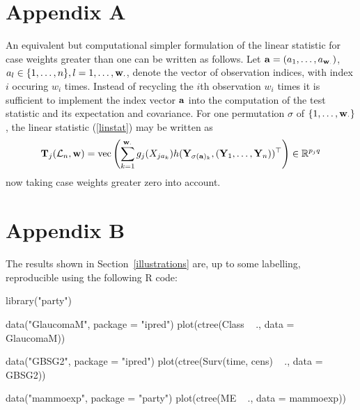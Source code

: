 
\section*{Appendix A}

An equivalent but computational simpler formulation of the linear statistic
for case weights greater than one can be written as follows. Let $\mathbf{a} = (a_1,
\dots, a_{\mathbf{w}_\cdot})$, $a_l \in \{1, \dots, n\}, l = 1, \dots, \mathbf{w}_\cdot$, denote the
vector of observation indices, with index $i$ occuring $w_i$ times. 
Instead of recycling the $i$th observation $w_i$ times it is sufficient to
implement the index vector $\mathbf{a}$ into the computation of the test statistic
and its expectation and covariance. For one
permutation $\sigma$ of $\{1, \dots, \mathbf{w}_\cdot\}$, the linear statistic
(\ref{linstat}) may be written as 
\begin{eqnarray*}
\mathbf{T}_j(\mathcal{L}_n, \mathbf{w}) = \text{vec} \left(\sum_{k=1}^{\mathbf{w}_\cdot} g_j(X_{ja_k})
           h(\mathbf{Y}_{\sigma(\mathbf{a})_k}, (\mathbf{Y}_1, \dots, \mathbf{Y}_n))^\top \right) \in \mathbb{R}^{p_jq}
\end{eqnarray*}
now taking case weights greater zero into account.

\section*{Appendix B}

The results shown in Section~\ref{illustrations} are, up to some labelling, 
reproducible using the following \textsf{R} code:

\renewcommand{\baselinestretch}{1}

\begin{Sinput}
library("party")

data("GlaucomaM", package = "ipred")
plot(ctree(Class ~ ., data = GlaucomaM))

data("GBSG2", package = "ipred")  
plot(ctree(Surv(time, cens) ~ ., data = GBSG2))

data("mammoexp", package = "party")
plot(ctree(ME ~ ., data = mammoexp))
\end{Sinput}
